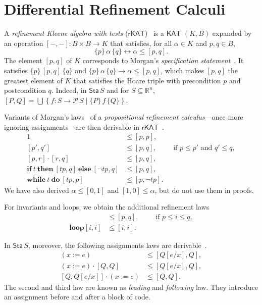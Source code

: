 \documentclass[envcountsame,envcountsect]{llncs}
\newcommand{\IF}[3]{\mathbf{if}\ #1\ \mathbf{then}\ #2\ \mathbf{else}\ #3}
\newcommand{\WHILE}[2]{\mathbf{while}\ #1\ \mathbf{do}\ #2}
\newcommand{\KAT}{\mathsf{KAT}}
\newcommand{\rKAT}{\mathsf{rKAT}}
\newcommand{\Pow}{\mathcal{P}}
\newcommand{\reals}{\mathbb{R}}
\newcommand{\sta}{\mathsf{Sta}}
\begin{document}

\section{Differential Refinement Calculi}\label{sec:refine}

A \emph{refinement Kleene algebra with tests}
($\rKAT$)~\cite{ArmstrongGS16}  is a $\KAT$
$(K,B)$ expanded by an operation $[-,-]:B\times B\to K$ that
satisfies, for all $\alpha \in K$ and $p,q\in B$, 
\begin{equation*}
  \{p\}\, \alpha\, \{q\} \leftrightarrow \alpha\le [p,q].
\end{equation*}
The element $[p,q]$ of $K$ corresponds to Morgan's \emph{specification
  statement}~\cite{Morgan94}. It satisfies $\{p\}\, [p,q]\, \{q\}$
and $\{p\}\, \alpha\, \{q\} \rightarrow \alpha\le [p,q]$, 
which makes $[p,q]$ the greatest element of $K$ that satisfies the Hoare
triple with precondition $p$ and postcondition $q$.  Indeed, in
$\sta\, S$ and for $S\subseteq \reals^n$,
$ [P,Q] = \bigcup \left\{f:S\to \Pow\, S \mid \{P\}\, f\,
  \{Q\}\right\}$. 

Variants of Morgan's laws~\cite{Morgan94} of a \emph{propositional
  refinement calculus}---once more ignoring assignments---are then derivable in
$\rKAT$~\cite{ArmstrongGS16}.
\begin{align}
  1 &\le [p,p],\label{eq:r-skip}\tag{r-skip}\\
[p',q'] &\le [p,q],\qquad \text{ if } p\le p'\text{ and } q'\le q,\label{eq:r-cons}\tag{r-cons}\\
[p,r]\cdot [r,q] &\le [p,q],\label{eq:r-seq}\tag{r-seq}\\
\IF{t}{[tp,q]}{[\neg tp,q]} &\le [p,q],\label{eq:r-cond}\tag{r-cond}\\
 \WHILE{t}{[tp,p]} &\le [p,\neg tp]. \label{eq:r-while}\tag{r-while}
\end{align}
We have also derived $\alpha \le [0,1]$ and $[1,0] \le \alpha$, but do
not use them in proofs.

For invariants and loops, we obtain the additional refinement laws
\begin{align}
  [i,i] &\le [p,q],\qquad \text{ if } p\le i \le q,\label{eq:r-inv}\tag{r-inv}\\
\mathbf{loop} [i,i] &\le [i,i]. \label{eq:r-loop}\tag{r-loop}
\end{align}

In $\sta\, S$, moreover, the following assignments laws are
derivable~\cite{ArmstrongGS16}.
\begin{align}
 (x := e)  &\le  \left[Q[e/x],Q\right],\label{eq:r-assgn}\tag{r-assgn}\\
(x:= e) \cdot \left[Q,Q\right] &\le [Q[e/x],Q],\label{eq:r-assgn}\tag{r-assgnl}\\
\left[Q,Q[e/x]\right]\cdot (x:=e) &\le [Q,Q]. \label{eq:r-assgn}\tag{r-assgnf}
\end{align}
The second and third law are known as \emph{leading} and \emph{following}
law. They introduce an assignment before and after a block of code. 
\end{document}

